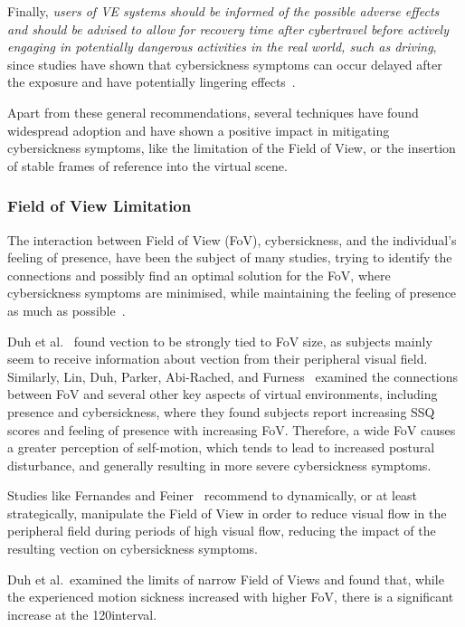 Finally, \textit{users of VE systems should be informed of the possible adverse effects and should be advised to
allow for recovery time after cybertravel before actively engaging in potentially dangerous activities in the real
world, such as driving}, since studies have shown that cybersickness symptoms can occur delayed after the exposure
and have potentially lingering effects~\cite{LaViola2000}.

Apart from these general recommendations, several techniques have found widespread adoption and have shown a positive
impact in mitigating cybersickness symptoms, like the limitation of the Field of View, or the insertion of stable
frames of reference into the virtual scene.


\subsubsection{Field of View Limitation}\label{subsubsec:field-of-view-limitation}

The interaction between Field of View (FoV), cybersickness, and the individual's feeling of presence, have been the
subject of many studies, trying to identify the connections and possibly find an optimal solution for the FoV, where
cybersickness symptoms are minimised, while maintaining the feeling of presence as much as possible~\cite{Weech2019}.

Duh et al.~\cite{Duh2001} found vection to be strongly tied to FoV size, as subjects mainly seem to receive
information about vection from their peripheral visual field.
Similarly, Lin, Duh, Parker, Abi-Rached, and Furness~\cite{Lin2002} examined the connections between FoV and several
other key aspects of virtual environments, including presence and cybersickness, where they found subjects report
increasing SSQ scores and feeling of presence with increasing FoV\@.
Therefore, a wide FoV causes a greater perception of self-motion, which tends to lead to increased postural
disturbance, and generally resulting in more severe cybersickness symptoms.

Studies like Fernandes and Feiner~\cite{Fernandes2016} recommend to dynamically, or at least strategically, manipulate
the Field of View in order to reduce visual flow in the peripheral field during periods of high visual flow, reducing
the impact of the resulting vection on cybersickness symptoms.

Duh et al.\ examined the limits of narrow Field of Views and found that, while the experienced motion sickness
increased with higher FoV, there is a significant increase at the 120\textdegree interval.

